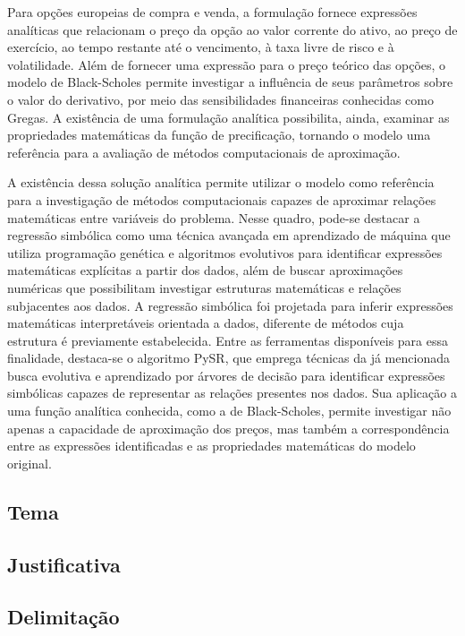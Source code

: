 Para opções europeias de compra e venda, a formulação fornece expressões analíticas que relacionam o preço da opção ao valor corrente do ativo, ao preço de exercício, ao tempo restante até o vencimento, à taxa livre de risco e à volatilidade. Além de fornecer uma expressão para o preço teórico das opções, o modelo de Black-Scholes permite investigar a influência de seus parâmetros sobre o valor do derivativo, por meio das sensibilidades financeiras conhecidas como Gregas. A existência de uma formulação analítica possibilita, ainda, examinar as propriedades matemáticas da função de precificação, tornando o modelo uma referência para a avaliação de métodos computacionais de aproximação.

A existência dessa solução analítica permite utilizar o modelo como referência para a investigação de métodos computacionais capazes de aproximar relações matemáticas entre variáveis do problema. Nesse quadro, pode-se destacar a regressão simbólica como uma técnica avançada em aprendizado de máquina que utiliza programação genética e algoritmos evolutivos para identificar expressões matemáticas explícitas a partir dos dados, além de buscar aproximações numéricas que possibilitam investigar estruturas matemáticas e relações subjacentes aos dados. A regressão simbólica foi projetada para inferir expressões matemáticas interpretáveis orientada a dados, diferente de métodos cuja estrutura é previamente estabelecida. Entre as ferramentas disponíveis para essa finalidade, destaca-se o algoritmo PySR, que emprega técnicas da já mencionada busca evolutiva e aprendizado por árvores de decisão para identificar expressões simbólicas capazes de representar as relações presentes nos dados. Sua aplicação a uma função analítica conhecida, como a de Black-Scholes, permite investigar não apenas a capacidade de aproximação dos preços, mas também a correspondência entre as expressões identificadas e as propriedades matemáticas do modelo original.

\subsection{Tema}

\subsection{Justificativa}

\subsection{Delimitação}

